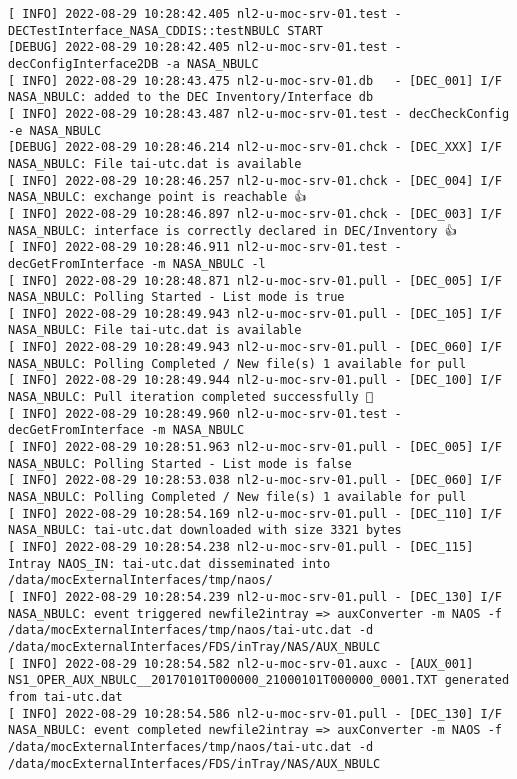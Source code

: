 \documentclass[dec_sum_main.tex]{subfiles}
\begin{document}
\begin{Verbatim}[fontsize=\tiny]
[ INFO] 2022-08-29 10:28:42.405 nl2-u-moc-srv-01.test - DECTestInterface_NASA_CDDIS::testNBULC START
[DEBUG] 2022-08-29 10:28:42.405 nl2-u-moc-srv-01.test - decConfigInterface2DB -a NASA_NBULC
[ INFO] 2022-08-29 10:28:43.475 nl2-u-moc-srv-01.db   - [DEC_001] I/F NASA_NBULC: added to the DEC Inventory/Interface db
[ INFO] 2022-08-29 10:28:43.487 nl2-u-moc-srv-01.test - decCheckConfig -e NASA_NBULC
[DEBUG] 2022-08-29 10:28:46.214 nl2-u-moc-srv-01.chck - [DEC_XXX] I/F NASA_NBULC: File tai-utc.dat is available
[ INFO] 2022-08-29 10:28:46.257 nl2-u-moc-srv-01.chck - [DEC_004] I/F NASA_NBULC: exchange point is reachable 👍
[ INFO] 2022-08-29 10:28:46.897 nl2-u-moc-srv-01.chck - [DEC_003] I/F NASA_NBULC: interface is correctly declared in DEC/Inventory 👍
[ INFO] 2022-08-29 10:28:46.911 nl2-u-moc-srv-01.test - decGetFromInterface -m NASA_NBULC -l
[ INFO] 2022-08-29 10:28:48.871 nl2-u-moc-srv-01.pull - [DEC_005] I/F NASA_NBULC: Polling Started - List mode is true
[ INFO] 2022-08-29 10:28:49.943 nl2-u-moc-srv-01.pull - [DEC_105] I/F NASA_NBULC: File tai-utc.dat is available
[ INFO] 2022-08-29 10:28:49.943 nl2-u-moc-srv-01.pull - [DEC_060] I/F NASA_NBULC: Polling Completed / New file(s) 1 available for pull
[ INFO] 2022-08-29 10:28:49.944 nl2-u-moc-srv-01.pull - [DEC_100] I/F NASA_NBULC: Pull iteration completed successfully 🕺
[ INFO] 2022-08-29 10:28:49.960 nl2-u-moc-srv-01.test - decGetFromInterface -m NASA_NBULC
[ INFO] 2022-08-29 10:28:51.963 nl2-u-moc-srv-01.pull - [DEC_005] I/F NASA_NBULC: Polling Started - List mode is false
[ INFO] 2022-08-29 10:28:53.038 nl2-u-moc-srv-01.pull - [DEC_060] I/F NASA_NBULC: Polling Completed / New file(s) 1 available for pull
[ INFO] 2022-08-29 10:28:54.169 nl2-u-moc-srv-01.pull - [DEC_110] I/F NASA_NBULC: tai-utc.dat downloaded with size 3321 bytes
[ INFO] 2022-08-29 10:28:54.238 nl2-u-moc-srv-01.pull - [DEC_115] Intray NAOS_IN: tai-utc.dat disseminated into /data/mocExternalInterfaces/tmp/naos/
[ INFO] 2022-08-29 10:28:54.239 nl2-u-moc-srv-01.pull - [DEC_130] I/F NASA_NBULC: event triggered newfile2intray => auxConverter -m NAOS -f /data/mocExternalInterfaces/tmp/naos/tai-utc.dat -d /data/mocExternalInterfaces/FDS/inTray/NAS/AUX_NBULC
[ INFO] 2022-08-29 10:28:54.582 nl2-u-moc-srv-01.auxc - [AUX_001] NS1_OPER_AUX_NBULC__20170101T000000_21000101T000000_0001.TXT generated from tai-utc.dat
[ INFO] 2022-08-29 10:28:54.586 nl2-u-moc-srv-01.pull - [DEC_130] I/F NASA_NBULC: event completed newfile2intray => auxConverter -m NAOS -f /data/mocExternalInterfaces/tmp/naos/tai-utc.dat -d /data/mocExternalInterfaces/FDS/inTray/NAS/AUX_NBULC

\end{Verbatim}
\end{document}
